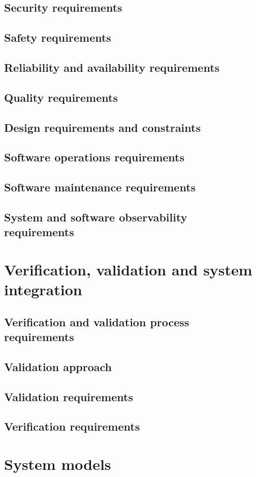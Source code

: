 \subsection{Security requirements }
\subsection{Safety requirements}
\subsection{Reliability and availability requirements}
\subsection{Quality requirements}
\subsection{Design requirements and constraints}
\subsection{Software operations requirements}
\subsection{Software maintenance requirements}
\subsection{System and software observability requirements}
\section{Verification, validation and system integration}
 \subsection{Verification and validation process requirements}
 \subsection{Validation approach}
 \subsection{Validation requirements}
 \subsection{Verification requirements}
 \section{System models}

